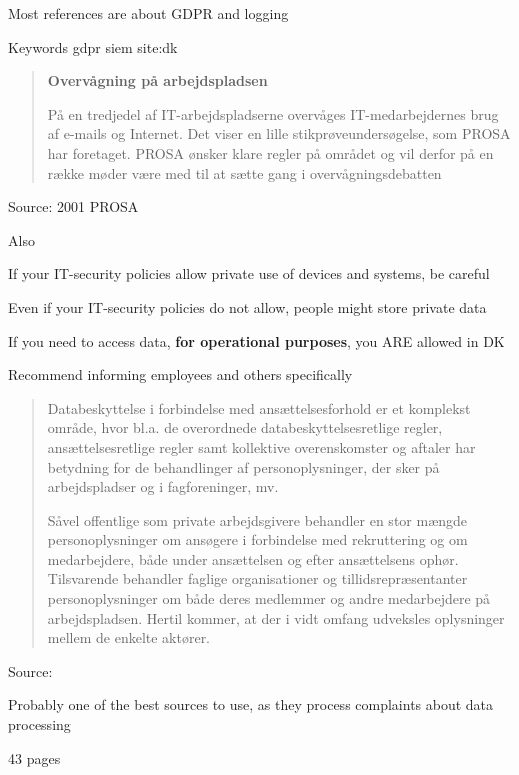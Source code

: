 \documentclass[Screen16to9,17pt]{foils}
\begin{document}
\begin{list2}
\item Most references are about GDPR and logging
\item Keywords gdpr siem site:dk
  \item {}
\end{list2}




\begin{quote}{\bf
  Overvågning på arbejdspladsen}

  På en tredjedel af IT-arbejdspladserne overvåges IT-medarbejdernes brug af e-mails og Internet. Det viser en lille stikprøveundersøgelse, som PROSA har foretaget. PROSA ønsker klare regler på området og vil derfor på en række møder være med til at sætte gang i overvågningsdebatten
\end{quote}
Source: 2001 PROSA {\footnotesize{}}

\begin{list2}
  \item Also {\footnotesize{}}
\item If your IT-security policies allow private use of devices and systems, be careful
\item Even if your IT-security policies do not allow, people might store private data
\item If you need to access data, {\bf for operational purposes}, you ARE allowed in DK
\item Recommend informing employees and others specifically
\end{list2}



\begin{quote}
Databeskyttelse i forbindelse med ansættelsesforhold er et komplekst område, hvor bl.a. de overordnede databeskyttelsesretlige regler, ansættelsesretlige regler samt kollektive overenskomster og aftaler har betydning for de behandlinger af personoplysninger, der sker på arbejdspladser og i fagforeninger, mv.

Såvel offentlige som private arbejdsgivere behandler en stor mængde personoplysninger om ansøgere i forbindelse med rekruttering og om medarbejdere, både under ansættelsen og efter ansættelsens ophør. Tilsvarende behandler faglige organisationer og tillidsrepræsentanter personoplysninger om både deres medlemmer og andre medarbejdere på arbejdspladsen. Hertil kommer, at der i vidt omfang udveksles oplysninger mellem de enkelte aktører.
\end{quote}
Source: {\footnotesize{}}

\begin{list2}
\item Probably one of the best sources to use, as they process complaints about data processing
\item 43 pages
\end{list2}
\end{document}
